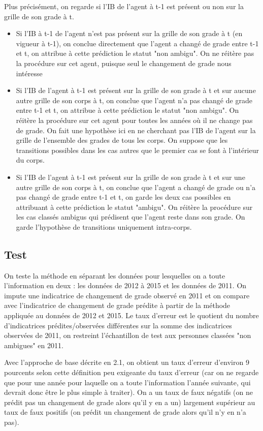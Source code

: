 \documentclass[11pt,a4paper]{article}
\begin{document}
Plus précisément, on regarde si l'IB de l'agent à t-1 est présent ou non sur la grille de son grade à t.
\begin{itemize} 
	\item Si l'IB à t-1 de l'agent n'est pas présent sur la grille de son grade à t (en vigueur à t-1), on conclue directement que l'agent a changé de grade entre t-1 et t, on attribue à cette prédiction le statut "non ambigu". On ne réitère pas la procédure sur cet agent, puisque seul le changement de grade nous intéresse
	\item Si l'IB de l'agent à t-1 est présent sur la grille de son grade à t et sur aucune autre grille de son corps à t, on conclue que l'agent n'a pas changé de grade entre t-1 et t, on attribue à cette prédiction le statut "non ambigu". On réitère la procédure sur cet agent pour toutes les années où il ne change pas de grade. On fait une hypothèse ici en ne cherchant pas l'IB de l'agent sur la grille de l'ensemble des grades de tous les corps. On suppose que les transitions possibles dans les cas autres que le premier cas se font à l'intérieur du corps.
	\item Si l'IB de l'agent à t-1 est présent sur la grille de son grade à t et sur une autre grille de son corps à t, on conclue que l'agent a changé de grade ou n'a pas changé de grade entre t-1 et t, on garde les deux cas possibles en attribuant à cette prédiction le statut "ambigu". On réitère la procédure sur les cas classés ambigus qui prédisent que l'agent reste dans son grade. On garde l'hypothèse de transitions uniquement intra-corps.
\end{itemize}


\subsection{Test}
On teste la méthode en séparant les données pour lesquelles on a toute l'information en deux : les données de 2012 à 2015 et les données de 2011. On impute une indicatrice de changement de grade observé en 2011 et on compare avec l'indicatrice de changement de grade prédite à partir de la méthode appliquée au données de 2012 et 2015. Le taux d'erreur est le quotient du nombre d'indicatrices prédites/observées différentes sur la somme des indicatrices observées de 2011, on restreint l'échantillon de test aux personnes classées "non ambigues" en 2011.

Avec l'approche de base décrite en 2.1, on obtient un taux d'erreur d'environ 9 pourcents selon cette définition peu exigeante du taux d'erreur (car on ne regarde que pour une année pour laquelle on a toute l'information l'année suivante, qui devrait donc être le plus simple à traiter). On a un taux de faux négatifs (on ne prédit pas un changement de grade alors qu'il y en a un) largement supérieur au taux de faux positifs (on prédit un changement de grade alors qu'il n'y en n'a pas).
\end{document}
